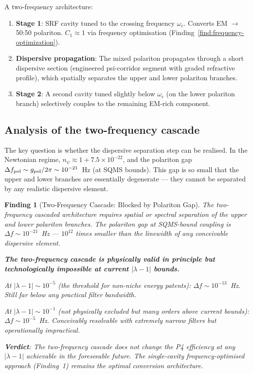 \documentclass[11pt]{article}
\newtheorem{finding}{Finding}
\newcommand{\ee}[1]{\times 10^{#1}}
\newcommand{\lambdaone}{|\lambda{-}1|}
\newcommand{\npsi}{n_\psi}
\begin{document}
A two-frequency architecture:
\begin{enumerate}
\item \textbf{Stage 1}: SRF cavity tuned to the crossing frequency
  $\omega_c$. Converts EM $\to$ 50:50 polariton. $C_1 \approx 1$ via
  frequency optimisation (Finding~\ref{find:frequency-optimization}).
\item \textbf{Dispersive propagation}: The mixed polariton propagates
  through a short dispersive section (engineered psi-corridor segment with
  graded refractive profile), which spatially separates the upper and lower
  polariton branches.
\item \textbf{Stage 2}: A second cavity tuned slightly below $\omega_c$
  (on the lower polariton branch) selectively couples to the remaining
  EM-rich component.
\end{enumerate}

\subsection{Analysis of the two-frequency cascade}

The key question is whether the dispersive separation step can be
realised. In the Newtonian regime, $\npsi \approx 1 + 7.5\ee{-22}$, and
the polariton gap $\Delta f_{\rm pol} \sim g_{\rm pol}/2\pi \sim
10^{-21}$~Hz (at SQMS bounds). This gap is so small that the upper and
lower branches are essentially degenerate --- they cannot be separated by
any realistic dispersive element.

\begin{finding}[Two-Frequency Cascade: Blocked by Polariton Gap]
\label{find:cascade-blocked}
The two-frequency cascaded architecture requires spatial or spectral
separation of the upper and lower polariton branches. The polariton gap
at SQMS-bound coupling is $\Delta f \sim 10^{-21}$~Hz --- $10^{12}$ times
smaller than the linewidth of any conceivable dispersive element.

\textbf{The two-frequency cascade is physically valid in principle but
technologically impossible at current $\lambdaone$ bounds.}

At $\lambdaone \sim 10^{-5}$ (the threshold for non-niche energy patents):
$\Delta f \sim 10^{-13}$~Hz. Still far below any practical filter
bandwidth.

At $\lambdaone \sim 10^{-1}$ (not physically excluded but many orders above
current bounds): $\Delta f \sim 10^{-5}$~Hz. Conceivably resolvable with
extremely narrow filters but operationally impractical.

\textbf{Verdict}: The two-frequency cascade does not change the P4
efficiency at any $\lambdaone$ achievable in the foreseeable future.
The single-cavity frequency-optimised approach (Finding~1) remains the
optimal conversion architecture.
\end{finding}
\end{document}
